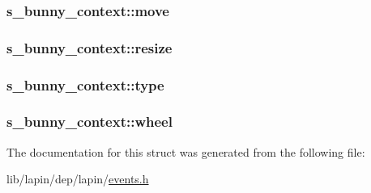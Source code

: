\hypertarget{structs__bunny__context_abb695dc2284c1372ded629b6d09886a2}{
\subsubsection[{move}]{ s\-\_\-bunny\-\_\-context\-::move}}\label{structs__bunny__context_abb695dc2284c1372ded629b6d09886a2}
\hypertarget{structs__bunny__context_a90ca6419f3b754ca9bdce2340f388ad1}{
\subsubsection[{resize}]{ s\-\_\-bunny\-\_\-context\-::resize}}\label{structs__bunny__context_a90ca6419f3b754ca9bdce2340f388ad1}
\hypertarget{structs__bunny__context_a09e78fc6f235790fb307e3d754a37cc7}{
\subsubsection[{type}]{ s\-\_\-bunny\-\_\-context\-::type}}\label{structs__bunny__context_a09e78fc6f235790fb307e3d754a37cc7}
\hypertarget{structs__bunny__context_a43f726e270fb1747ee94bb5bbcae8f86}{
\subsubsection[{wheel}]{ s\-\_\-bunny\-\_\-context\-::wheel}}\label{structs__bunny__context_a43f726e270fb1747ee94bb5bbcae8f86}


The documentation for this struct was generated from the following file\-:\begin{DoxyCompactItemize}
\item 
lib/lapin/dep/lapin/\hyperlink{events_8h}{events.\-h}\end{DoxyCompactItemize}
